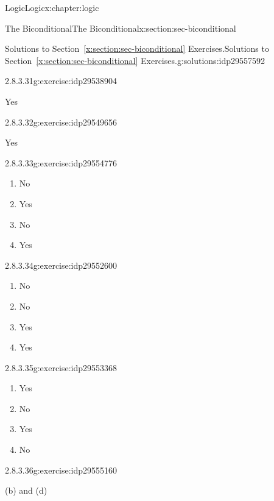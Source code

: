 \documentclass[twoside,10pt,]{book}
\newcommand{\xreffont}{\relax}
\numberwithin{equation}{section}
\begin{document}
\begin{chapterptx}{Logic}{}{Logic}{}{}{x:chapter:logic}
\begin{sectionptx}{The Biconditional}{}{The Biconditional}{}{}{x:section:sec-biconditional}
\begin{solutions-subsection}{Solutions to Section~{\xreffont\ref*{x:section:sec-biconditional}} Exercises.}{}{Solutions to Section~{\xreffont\ref*{x:section:sec-biconditional}} Exercises.}{}{}{g:solutions:idp29557592}
\begin{exercisegroup}
\begin{divisionsolutioneg}{2.8.3.31}{}{g:exercise:idp29538904}
\par\smallskip%
\noindent\hypertarget{g:solution:idp29546840-main}{}Yes\end{divisionsolutioneg}%
\begin{divisionsolutioneg}{2.8.3.32}{}{g:exercise:idp29549656}%
\par\smallskip%
\noindent\hypertarget{g:solution:idp29554648-main}{}Yes\end{divisionsolutioneg}%
\end{exercisegroup}
\par\medskip\noindent
\begin{divisionsolution}{2.8.3.33}{}{g:exercise:idp29554776}%
\par\smallskip%
\noindent\hypertarget{g:solution:idp29549016-main}{}%
\begin{enumerate}[label=(\alph*)]
\item{}No%
\item{}Yes%
\item{}No%
\item{}Yes%
\end{enumerate}
\end{divisionsolution}%
\begin{divisionsolution}{2.8.3.34}{}{g:exercise:idp29552600}%
\par\smallskip%
\noindent\hypertarget{g:solution:idp29551064-main}{}%
\begin{enumerate}[label=(\alph*)]
\item{}No%
\item{}No%
\item{}Yes%
\item{}Yes%
\end{enumerate}
\end{divisionsolution}%
\begin{divisionsolution}{2.8.3.35}{}{g:exercise:idp29553368}%
\par\smallskip%
\noindent\hypertarget{g:solution:idp29548504-main}{}%
\begin{enumerate}[label=(\alph*)]
\item{}Yes%
\item{}No%
\item{}Yes%
\item{}No%
\end{enumerate}
\end{divisionsolution}%
\begin{divisionsolution}{2.8.3.36}{}{g:exercise:idp29555160}%
\par\smallskip%
\noindent\hypertarget{g:solution:idp29555288-main}{}(b) and (d)\end{divisionsolution}%
\end{solutions-subsection}
\end{sectionptx}
\end{chapterptx}
\end{document}
